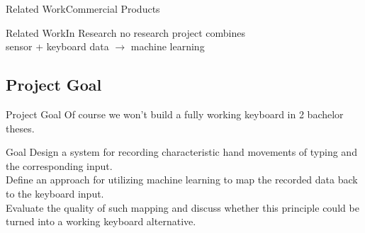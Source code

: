 \begin{frame}{Related Work}{Commercial Products}
\end{frame}

\begin{frame}{Related Work}{In Research}
    \center
    \vfill
    no research project combines\\[1em]
    sensor + keyboard data $\rightarrow$ machine learning
    \vfill
\end{frame}

\subsection{Project Goal}
\begin{frame}{Project Goal}
    Of course we won't build a fully working keyboard in 2 bachelor theses.
    \pause
    \vspace{2em}
    \begin{block}{Goal}
        Design a system for recording characteristic hand movements of typing
        and the corresponding input.\\[1em]

        Define an approach for utilizing machine learning to map the recorded
        data back to the keyboard input.\\[1em]

        Evaluate the quality of such mapping and discuss whether this principle
        could be turned into a working keyboard alternative.
    \end{block}
\end{frame}
